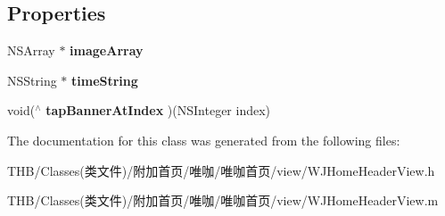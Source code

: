 \subsection*{Properties}
\begin{DoxyCompactItemize}
\item 
\mbox{\label{interface_w_j_home_header_view_a0f9719a5a7b95adcaac25f1e5661828b}} 
N\+S\+Array $\ast$ {\bfseries image\+Array}
\item 
\mbox{\label{interface_w_j_home_header_view_addf9725334b912cf0236a4494c8195f0}} 
N\+S\+String $\ast$ {\bfseries time\+String}
\item 
\mbox{\label{interface_w_j_home_header_view_a80b38205fc451c39bcde0a08ce9c2a91}} 
void($^\wedge$ {\bfseries tap\+Banner\+At\+Index} )(N\+S\+Integer index)
\end{DoxyCompactItemize}


The documentation for this class was generated from the following files\+:\begin{DoxyCompactItemize}
\item 
T\+H\+B/\+Classes(类文件)/附加首页/唯咖/唯咖首页/view/W\+J\+Home\+Header\+View.\+h\item 
T\+H\+B/\+Classes(类文件)/附加首页/唯咖/唯咖首页/view/W\+J\+Home\+Header\+View.\+m\end{DoxyCompactItemize}
